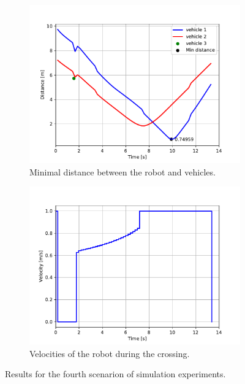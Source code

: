             \begin{figure}[ht]
                \centering
                \begin{subfigure}{0.49\linewidth}
                    \centering
                    \includegraphics[trim={24 8 40 41}, clip, width=\linewidth]{images/simulations/scene4_1_dist.pdf}
                    \caption{Minimal distance between the robot and vehicles.}
                \end{subfigure}
                \begin{subfigure}{0.49\linewidth}
                    \centering
                    \includegraphics[trim={21 8 40 41}, clip, width=\linewidth]{images/simulations/scene4_1_vel.pdf}
                    \caption{Velocities of the robot during the crossing.}
                \end{subfigure}
                \caption{Results for the fourth scenarion of simulation experiments.}
                \label{fig:scene4_1_graphs}
            \end{figure}
